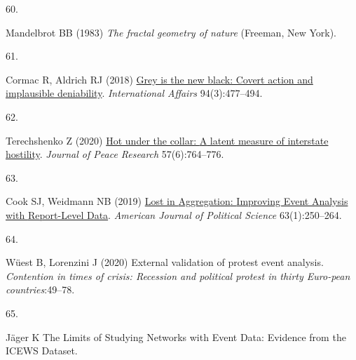 \documentclass{article}
\newlength{\cslhangindent}
\newlength{\csllabelwidth}
\newlength{\cslentryspacingunit} %
\newenvironment{CSLReferences}[2] %
 {%
  \setlength{\parindent}{0pt}
  \ifodd #1
  \let\oldpar\par
  \def\par{\hangindent=\cslhangindent\oldpar}
  \fi
  \setlength{\parskip}{#2\cslentryspacingunit}
 }%
 {}
\newcommand{\CSLLeftMargin}[1]{\parbox[t]{\csllabelwidth}{#1}}
\newcommand{\CSLRightInline}[1]{\parbox[t]{\linewidth - \csllabelwidth}{#1}\break}
\begin{document}
\begin{CSLReferences}{0}{0}
\leavevmode{}%
\CSLLeftMargin{60. }
\CSLRightInline{Mandelbrot BB (1983) \emph{The fractal geometry of
nature} ({Freeman}, {New York}).}

\leavevmode{}%
\CSLLeftMargin{61. }
\CSLRightInline{Cormac R, Aldrich RJ (2018)
\href{https://doi.org/10.1093/ia/iiy067}{Grey is the new black: Covert
action and implausible deniability}. \emph{International Affairs}
94(3):477--494.}

\leavevmode{}%
\CSLLeftMargin{62. }
\CSLRightInline{Terechshenko Z (2020)
\href{https://doi.org/10.1177/0022343320962546}{Hot under the collar:
{A} latent measure of interstate hostility}. \emph{Journal of Peace
Research} 57(6):764--776.}

\leavevmode{}%
\CSLLeftMargin{63. }
\CSLRightInline{Cook SJ, Weidmann NB (2019)
\href{https://doi.org/10.1111/ajps.12398}{Lost in {Aggregation}:
{Improving Event Analysis} with {Report-Level Data}}. \emph{American
Journal of Political Science} 63(1):250--264.}

\leavevmode{}%
\CSLLeftMargin{64. }
\CSLRightInline{Wüest B, Lorenzini J (2020) External validation of
protest event analysis. \emph{Contention in times of crisis: Recession
and political protest in thirty Euro-pean countries}:49--78.}

\leavevmode{}%
\CSLLeftMargin{65. }
\CSLRightInline{Jäger K The {Limits} of {Studying Networks} with {Event
Data}: {Evidence} from the {ICEWS Dataset}.}

\end{CSLReferences}



\end{document}
